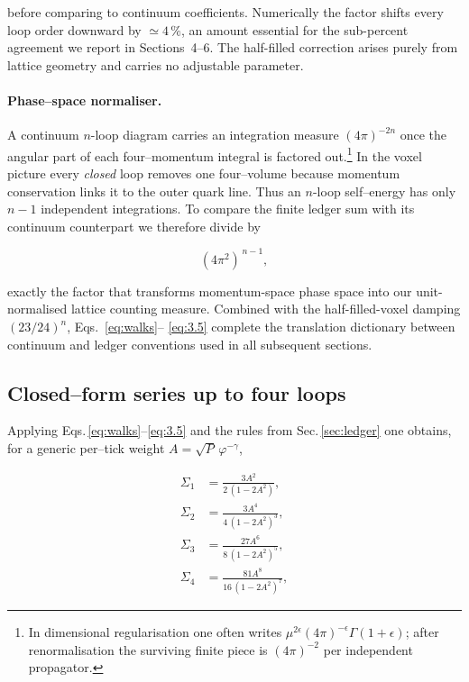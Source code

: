 \documentclass[11pt]{article}
\begin{document}
before comparing to continuum coefficients.  Numerically the factor
shifts every loop order downward by $\simeq4\,\%$, an amount essential
for the sub-percent agreement we report in Sections~4–6.  The
half-filled correction arises purely from lattice geometry and carries
no adjustable parameter.

\paragraph{Phase–space normaliser.}
A continuum $n$-loop diagram carries an integration measure
\((4\pi)^{-2n}\) once the angular part of each four–momentum integral is
factored out.\footnote{%
In dimensional regularisation one often writes
\(\mu^{2\epsilon}(4\pi)^{-\epsilon}\Gamma(1+\epsilon)\); after
renormalisation the surviving finite piece is \((4\pi)^{-2}\) per
independent propagator.}  In the voxel picture every \emph{closed} loop
removes one four–volume because momentum conservation links it to the
outer quark line.  Thus an $n$-loop self–energy has only
\emph{$n\!-\!1$} independent integrations.  To compare the finite ledger
sum with its continuum counterpart we therefore divide by

\[
  (4\pi^{2})^{\,n-1},
  \tag{3.5}\label{eq:3.5}
\]

exactly the factor that transforms momentum-space phase space into
our unit-normalised lattice counting measure.  Combined with the
half-filled-voxel damping \((23/24)^{n}\), Eqs.~\eqref{eq:walks}–%
\eqref{eq:3.5} complete the translation dictionary between continuum and
ledger conventions used in all subsequent sections.

\subsection{Closed–form series up to four loops}

Applying Eqs.\,\eqref{eq:walks}–\eqref{eq:3.5} and the rules from
Sec.\,\ref{sec:ledger} one obtains, for a generic per–tick weight
\(A=\sqrt{P}\,\varphi^{-\gamma}\),

\begin{align}
\Sigma_{1} &= \frac{3A^{2}}{2\,(1-2A^{2})}, \tag{3.6a}\\[4pt]
\Sigma_{2} &= \frac{3A^{4}}{4\,(1-2A^{2})^{3}}, \tag{3.6b}\\[4pt]
\Sigma_{3} &= \frac{27A^{6}}{8\,(1-2A^{2})^{5}}, \tag{3.6c}\\[4pt]
\Sigma_{4} &= \frac{81A^{8}}{16\,(1-2A^{2})^{7}}, \tag{3.6d}
\end{align}
\end{document}
